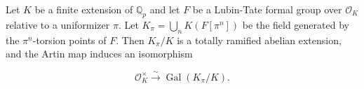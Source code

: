 Let $K$ be a finite extension of $\mathbb{Q}_p$ and let $F$ be a Lubin-Tate formal group over $\mathcal{O}_K$ relative to a uniformizer $\pi$. Let $K_{\pi} = \bigcup_n K(F[\pi^n])$ be the field generated by the $\pi^n$-torsion points of $F$. Then $K_{\pi}/K$ is a totally ramified abelian extension, and the Artin map induces an isomorphism

$$\mathcal{O}_K^{\times} \xrightarrow{\sim} \operatorname{Gal}(K_{\pi}/K).$$
